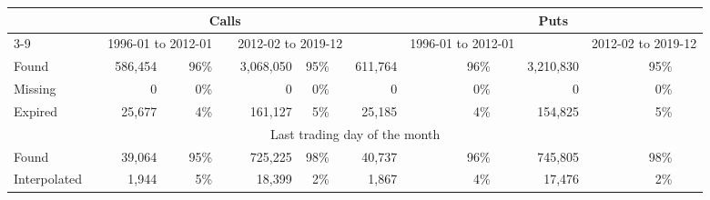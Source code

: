 

		\begin{tabular}{*{2}{l} *{15}{r} }
		       
		        
		         \multicolumn{2}{c}{}  & \multicolumn{7}{c}{Calls}  &  \multicolumn{1}{c}{} & 
		         \multicolumn{7}{c}{Puts} \\
		         
		          
		         \cline{3-9}
		         \cline{11-17}
		       
		         
		          \multicolumn{1}{l}{Observations} &  \multicolumn{1}{l}{} &
		          \multicolumn{3}{c}{1996-01 to 2012-01} & 
		          \multicolumn{1}{c}{} &
			\multicolumn{3}{c}{2012-02 to 2019-12} & 
			\multicolumn{1}{c}{} &
		          \multicolumn{3}{c}{1996-01 to 2012-01} & 
		          \multicolumn{1}{c}{} &
			\multicolumn{3}{c}{2012-02 to 2019-12} & 
		        

		       \hline
		       
		       \multicolumn{17}{c}{All trading days} \\ 
		       
		       \hline 

	
		Found &   & 
		586,454 &  & 96\% & 
		 & 
		 3,068,050 & 95\% & 
		 & 
		 611,764 &  & 96\% & 
		 & 
		 3,210,830& &95\% 
		 \\

		
		Missing &   & 
		0 &  & 0\% & 
		 & 
		 0 & 0\% & 
		 & 
		 0 &  & 0\% & 
		 & 
		 0& &0\% 
		 \\

		
		Expired &   & 
		25,677 &  & 4\% & 
		 & 
		 161,127 & 5\% & 
		 & 
		 25,185 &  & 4\% & 
		 & 
		 154,825& &5\% 
		 \\

		
        \hline
        
         \multicolumn{17}{c}{Last trading day of the month} \\

	
		Found &   & 
		39,064 &  & 95\% & 
		 & 
		 725,225 & 98\% & 
		 & 
		 40,737 &  & 96\% & 
		 & 
		 745,805& &98\% 
		 \\

		
		Interpolated &   & 
		1,944 &  & 5\% & 
		 & 
		 18,399 & 2\% & 
		 & 
		 1,867 &  & 4\% & 
		 & 
		 17,476& &2\% 
		 \\

		

	        \hline
	    \end{tabular}
	